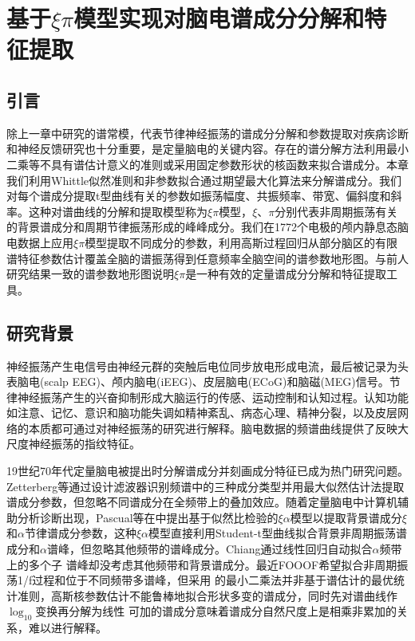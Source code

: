 \chapter{基于$\xi\pi$模型实现对脑电谱成分分解和特征提取}
\section{引言}
除上一章中研究的谱常模，代表节律神经振荡的谱成分分解和参数提取对疾病诊断和神经反馈研究也十分重要，是定量脑电的关键内容。存在的谱分解方法利用最小二乘等不具有谱估计意义的准则或采用固定参数形状的核函数来拟合谱成分。本章我们利用Whittle似然准则和非参数拟合通过期望最大化算法来分解谱成分。我们对每个谱成分提取t型曲线有关的参数如振荡幅度、共振频率、带宽、偏斜度和斜率。这种对谱曲线的分解和提取模型称为$\xi\pi$模型，$\xi$、$\pi$分别代表非周期振荡有关的背景谱成分和周期节律振荡形成的峰峰成分。我们在1772个电极的颅内静息态脑电数据上应用$\xi\pi$模型提取不同成分的参数，利用高斯过程回归从部分脑区的有限谱特征参数估计覆盖全脑的谱振荡得到任意频率全脑空间的谱参数地形图。与前人研究结果一致的谱参数地形图说明$\xi\pi$是一种有效的定量谱成分分解和特征提取工具。

\section{研究背景}
神经振荡产生电信号由神经元群的突触后电位同步放电形成电流，最后被记录为头表脑电(scalp EEG)、颅内脑电(iEEG)、皮层脑电(ECoG)和脑磁(MEG)信号。节律神经振荡产生的兴奋抑制形成大脑运行的传感、运动控制和认知过程。认知功能如注意、记忆、意识和脑功能失调如精神紊乱、病态心理、精神分裂，以及皮层网络的本质都可通过对神经振荡的研究进行解释。脑电数据的频谱曲线提供了反映大尺度神经振荡的指纹特征。

19世纪70年代定量脑电被提出时分解谱成分并刻画成分特征已成为热门研究问题。Zetterberg等通过设计滤波器识别频谱中的三种成分类型并用最大似然估计法提取谱成分参数，但忽略不同谱成分在全频带上的叠加效应。随着定量脑电中计算机辅助分析诊断出现，Pascual等在\cite{pascual1988parametric}中提出基于似然比检验的$\xi\alpha$模型以提取背景谱成分$\xi$和$\alpha$节律谱成分参数，这种$\xi\alpha$模型直接利用Student-t型曲线拟合背景非周期振荡谱成分和$\alpha$谱峰，但忽略其他频带的谱峰成分。Chiang通过线性回归自动拟合$\alpha$频带上的多个子
谱峰却没考虑其他频带和背景谱成分。最近FOOOF希望拟合非周期振荡1/f过程和位于不同频带多谱峰，但采用
的最小二乘法并非基于谱估计的最优统计准则，高斯核参数估计不能鲁棒地拟合形状多变的谱成分，同时先对谱曲线作$\log_{10}$变换再分解为线性
可加的谱成分意味着谱成分自然尺度上是相乘非累加的关系，难以进行解释。

